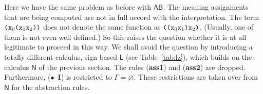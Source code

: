 Here we have the same problem as before with $\mathsf{AB}$. The meaning
assignments that are being computed are not in full
accord with the interpretation.  The term $\mbox{\tt (x}_0\mbox{\tt %
(x}_1\mbox{\tt x}_2\mbox{\tt ))}$ does not denote the same
function as $\mbox{\tt ((x}_0\mbox{\tt x}_1\mbox{\tt
)x}_2\mbox{\tt )}$. (Usually, one of them is not even well
defined.) So this raises the question whether it is at all
legitimate to proceed in this way. We shall avoid the question by
introducing a totally different calculus, sign based $\mathsf{L}$ 
(see Table~\ref{tab:lz}), which builds on the calculus $\mathsf{N}$ of the
previous section. The rules (\textbf{ass1}) and (\textbf{ass2}) are
dropped. Furthermore, ($\bullet$--\textbf{I}) is restricted to
$\Gamma = \varnothing$. These restrictions are taken over from
$\mathsf{N}$ for the abstraction rules.
